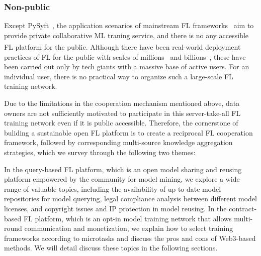 \subsubsection{Non-public} %
Except PySyft~\cite{ziller2021pysyft}, the application scenarios of mainstream FL frameworks~\cite{liu2021fate, abadi2016tensorflow, zeng2023fedlab, caldas2018leaf, ibmfl2020ibm, he2020fedml, beutel2020flower, roth2022nvidia} aim to provide private collaborative ML traning service, and there is no any accessible FL platform for the public\textsuperscript{}.
Although there have been real-world deployment practices of FL for the public with scales of millions~\cite{bonawitz2019towards} and billions~\cite{niu2020billion}, these have been carried out only by tech giants with a massive base of active users. For an individual user, there is no practical way to organize such a large-scale FL training network.

Due to the limitations in the cooperation mechanism mentioned above, data owners are not sufficiently motivated to participate in this server-take-all FL training network even if it is public accessible. 
Therefore, the cornerstone of buliding a sustainable open FL platform is to create a reciprocal FL cooperation framework, followed by corresponding multi-source knowledge aggregation strategies, which we survey through the following two themes:

In the query-based FL platform, which is an open model sharing and reusing platform empowered by the community for model mining, we explore a wide range of valuable topics, including the availability of up-to-date model repositories for model querying, legal compliance analysis between different model licenses, and copyright issues and IP protection in model reusing.
In the contract-based FL platform, which is an opt-in model training network that allows multi-round communication and monetization, we explain how to select training frameworks according to microtasks and discuss the pros and cons of Web3-based methods.
We will detail discuss these topics in the following sections.